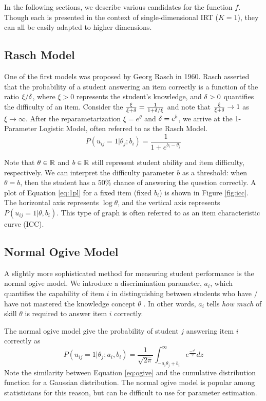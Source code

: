 In the following sections, we describe various candidates for the function $f$. Though each is presented in the context of single-dimensional IRT ($K = 1$), they can all be easily adapted to higher dimensions.

\subsection{Rasch Model}
One of the first models was proposed by Georg Rasch in 1960. Rasch asserted that the probability of a student answering an item correctly is a function of the ratio $\xi / \delta$, where $\xi > 0$ represents the student's knowledge, and $\delta > 0$ quantifies the difficulty of an item. Consider the $\frac{\xi}{\xi + \delta} = \frac{1}{1 + \delta / \xi}$ and note that $\frac{\xi}{\xi + \delta} \to 1$ as $\xi \to \infty$. After the reparametarization $\xi = e^{\theta}$ and $\delta = e^{b}$, we arrive at the 1-Parameter Logistic Model, often referred to as the Rasch Model.
\begin{equation}
  P(u_{ij} = 1 | \theta_j; b_i) = \frac{1}{1 + e^{b_i - \theta_j}}
  \label{eq:1pl}
\end{equation}

Note that $\theta \in \mathbb{R}$ and $b \in \mathbb{R}$ still represent student ability and item difficulty, respectively. We can interpret the difficulty parameter $b$ as a threshold: when $\theta = b$, then the student has a $50\%$ chance of answering the question correctly. A plot of Equation \ref{eq:1pl} for a fixed item (fixed $b_i$) is shown in Figure \ref{fig:icc}. The horizontal axis represents $\log \theta$, and the vertical axis represents $P(u_{ij} = 1 | \theta, b_i)$. This type of graph is often referred to as an item characteristic curve (ICC).

\subsection{Normal Ogive Model}
A slightly more sophisticated method for measuring student performance is the normal ogive model. We introduce a discrimination parameter, $a_i$, which quantifies the capability of item $i$ in distinguishing between students who have / have not mastered the knowledge concept $\theta$ \cite{thissen}. In other words, $a_i$ tells \textit{how much} of skill $\theta$ is required to answer item $i$ correctly. 

The normal ogive model give the probability of student $j$ answering item $i$ correctly as
\begin{equation}
  P(u_{ij} = 1 | \theta_j; a_i, b_i) = \frac{1}{\sqrt{2\pi}} \int_{-a_i \theta_j + b_i}^\infty e^{\frac{-z^{2}}{2}}dz
  \label{eq:ogive}
\end{equation}
Note the similarity between Equation \ref{eq:ogive} and the cumulative distribution function for a Gaussian distribution. The normal ogive model is popular among statisticians for this reason, but can be difficult to use for parameter estimation. 

